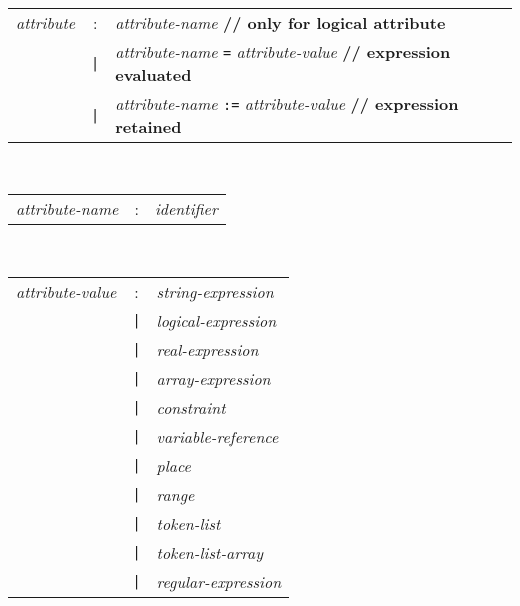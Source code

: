 \\
\begin{tabular}{p{4cm}cl}
\textit{attribute}
  &:& \textit{attribute-name} \textbf{// only for logical attribute} \\
  &\texttt{|}& \textit{attribute-name} \texttt{=} \textit{attribute-value}
    \textbf{// expression evaluated} \\
  &\texttt{|}& \textit{attribute-name} \texttt{:=} \textit{attribute-value}
    \textbf{// expression retained}
\end{tabular}
\\
\begin{tabular}{p{4cm}cl}
\textit{attribute-name}
  &:& \textit{identifier}
\end{tabular}
\\
\begin{tabular}{p{4cm}cl}
\textit{attribute-value}
  &:& \textit{string-expression} \\
  &\texttt{|}& \textit{logical-expression} \\
  &\texttt{|}& \textit{real-expression} \\
  &\texttt{|}& \textit{array-expression} \\
  &\texttt{|}& \textit{constraint} \\
  &\texttt{|}& \textit{variable-reference} \\
  &\texttt{|}& \textit{place} \\
  &\texttt{|}& \textit{range} \\
  &\texttt{|}& \textit{token-list} \\
  &\texttt{|}& \textit{token-list-array} \\
  &\texttt{|}& \textit{regular-expression}
\end{tabular}


